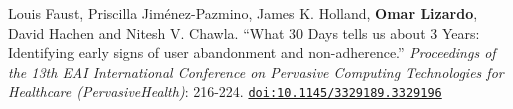 \ind Louis Faust, Priscilla Jim\'{e}nez-Pazmino, James K. Holland, {\bf Omar Lizardo}, David Hachen and Nitesh V. Chawla. ``What 30 Days tells us about 3 Years: Identifying early signs of user abandonment and non-adherence.'' {\em Proceedings of the 13th EAI International Conference on Pervasive Computing Technologies for Healthcare (PervasiveHealth)}: 216-224. \href{https://doi.org/10.1145/3329189.3329196}{\nolinkurl{doi:10.1145/3329189.3329196}}

